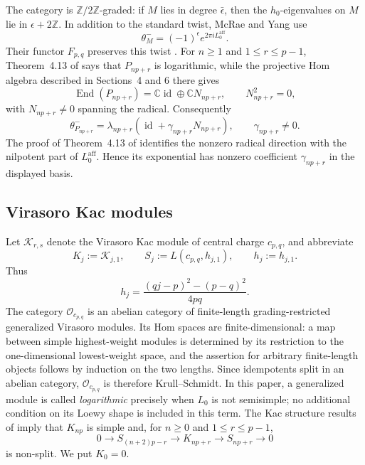 \documentclass[12pt,leqno]{amsart}
\numberwithin{equation}{section}
\newcommand{\End}{\operatorname{End}}
\newcommand{\id}{\operatorname{id}}
\newcommand{\Oc}{\mathcal O}
\newcommand{\Kac}{\mathcal K}
\def\Z{\mathbb{Z}}
\def\C{\mathbb{C}}
\begin{document}
The category is $\Z/2\Z$-graded: if $M$ lies in degree $\bar\epsilon$, then
the $h_0$-eigenvalues on $M$ lie in $\epsilon+2\Z$.  In addition to the
standard twist, McRae and Yang use
\begin{equation}\label{eq:minus-twist}
 \theta^-_M=(-1)^\epsilon e^{2\pi iL^{\mathrm{aff}}_0}.
\end{equation}
Their functor $F_{p,q}$ preserves this twist
\cite[Theorem~7.15]{McRaeYang}.  For $n\geq1$ and $1\leq r\leq p-1$,
Theorem~4.13 of \cite{McRaeYang} says that $P_{np+r}$ is logarithmic, while
the projective Hom algebra described in Sections~4 and 6 there gives
\[
 \End(P_{np+r})=\C\id\oplus\C N_{np+r},
 \qquad N_{np+r}^2=0,
\]
with $N_{np+r}\neq0$ spanning the radical.  Consequently
\begin{equation}\label{eq:source-twist-nilpotent}
 \theta^-_{P_{np+r}}
 =\lambda_{np+r}(\id+\gamma_{np+r}N_{np+r}),
 \qquad \gamma_{np+r}\neq0.
\end{equation}
The proof of Theorem~4.13 of \cite{McRaeYang} identifies the nonzero radical
direction with the nilpotent part of $L^{\mathrm{aff}}_0$.  Hence its exponential has
nonzero coefficient $\gamma_{np+r}$ in the displayed basis.

\subsection{Virasoro Kac modules}

Let $\Kac_{r,s}$ denote the Virasoro Kac module of central charge
$c_{p,q}$, and abbreviate
\[
 K_j:=\Kac_{j,1},
 \qquad
 S_j:=L(c_{p,q},h_{j,1}),
 \qquad
 h_j:=h_{j,1}.
\]
Thus
\begin{equation}\label{eq:weights}
 h_j=\frac{(qj-p)^2-(p-q)^2}{4pq}.
\end{equation}
The category $\Oc_{c_{p,q}}$ is an abelian category of finite-length
grading-restricted generalized Virasoro modules.  Its Hom spaces are
finite-dimensional: a map between simple highest-weight modules is
determined by its restriction to the one-dimensional lowest-weight space,
and the assertion for arbitrary finite-length objects follows by induction
on the two lengths.  Since
idempotents split in an abelian category, $\Oc_{c_{p,q}}$ is therefore
Krull--Schmidt.  In this paper, a generalized module is called
\emph{logarithmic} precisely when $L_0$ is not semisimple; no additional
condition on its Loewy shape is included in this term.  The Kac structure results of
\cite[Section~2.3]{McRaeSopin} imply that $K_{np}$ is simple and, for
$n\geq0$ and $1\leq r\leq p-1$,
\begin{equation}\label{eq:Kac-length-two}
 0\longrightarrow S_{(n+2)p-r}\longrightarrow K_{np+r}
 \longrightarrow S_{np+r}\longrightarrow0
\end{equation}
is non-split.  We put $K_0=0$.
\end{document}
